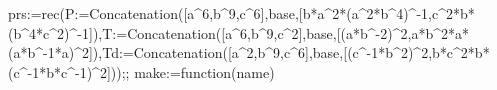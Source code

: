 \documentclass[
  10pt,
  letterpaper,
]{article}
\newenvironment{Shaded}{}{}
\newcommand{\BuiltInTok}[1]{\textcolor[rgb]{0.00,0.50,0.00}{#1}}
\newcommand{\ExtensionTok}[1]{#1}
\newcommand{\FloatTok}[1]{\textcolor[rgb]{0.25,0.63,0.44}{#1}}
\newcommand{\FunctionTok}[1]{\textcolor[rgb]{0.02,0.16,0.49}{#1}}
\newcommand{\NormalTok}[1]{#1}
\newcommand{\OperatorTok}[1]{\textcolor[rgb]{0.40,0.40,0.40}{#1}}
\newcommand{\VariableTok}[1]{\textcolor[rgb]{0.10,0.09,0.49}{#1}}
\begin{document}
\begin{Shaded}
\begin{Highlighting}[]
\VariableTok{prs}\OperatorTok{:=}\ExtensionTok{rec}\NormalTok{(}\VariableTok{P}\OperatorTok{:=}\BuiltInTok{Concatenation}\NormalTok{([}\VariableTok{a}\OperatorTok{\^{}}\FloatTok{6}\OperatorTok{,}\VariableTok{b}\OperatorTok{\^{}}\FloatTok{9}\OperatorTok{,}\VariableTok{c}\OperatorTok{\^{}}\FloatTok{6}\NormalTok{]}\OperatorTok{,}\VariableTok{base}\OperatorTok{,}\NormalTok{[}\VariableTok{b}\OperatorTok{*}\VariableTok{a}\OperatorTok{\^{}}\FloatTok{2}\OperatorTok{*}\NormalTok{(}\VariableTok{a}\OperatorTok{\^{}}\FloatTok{2}\OperatorTok{*}\VariableTok{b}\OperatorTok{\^{}}\FloatTok{4}\NormalTok{)}\OperatorTok{\^{}{-}}\FloatTok{1}\OperatorTok{,}\VariableTok{c}\OperatorTok{\^{}}\FloatTok{2}\OperatorTok{*}\VariableTok{b}\OperatorTok{*}\NormalTok{(}\VariableTok{b}\OperatorTok{\^{}}\FloatTok{4}\OperatorTok{*}\VariableTok{c}\OperatorTok{\^{}}\FloatTok{2}\NormalTok{)}\OperatorTok{\^{}{-}}\FloatTok{1}\NormalTok{])}\OperatorTok{,}\VariableTok{T}\OperatorTok{:=}\BuiltInTok{Concatenation}\NormalTok{([}\VariableTok{a}\OperatorTok{\^{}}\FloatTok{6}\OperatorTok{,}\VariableTok{b}\OperatorTok{\^{}}\FloatTok{9}\OperatorTok{,}\VariableTok{c}\OperatorTok{\^{}}\FloatTok{2}\NormalTok{]}\OperatorTok{,}\VariableTok{base}\OperatorTok{,}\NormalTok{[(}\VariableTok{a}\OperatorTok{*}\VariableTok{b}\OperatorTok{\^{}{-}}\FloatTok{2}\NormalTok{)}\OperatorTok{\^{}}\FloatTok{2}\OperatorTok{,}\VariableTok{a}\OperatorTok{*}\VariableTok{b}\OperatorTok{\^{}}\FloatTok{2}\OperatorTok{*}\VariableTok{a}\OperatorTok{*}\NormalTok{(}\VariableTok{a}\OperatorTok{*}\VariableTok{b}\OperatorTok{\^{}{-}}\FloatTok{1}\OperatorTok{*}\VariableTok{a}\NormalTok{)}\OperatorTok{\^{}}\FloatTok{2}\NormalTok{])}\OperatorTok{,}\VariableTok{Td}\OperatorTok{:=}\BuiltInTok{Concatenation}\NormalTok{([}\VariableTok{a}\OperatorTok{\^{}}\FloatTok{2}\OperatorTok{,}\VariableTok{b}\OperatorTok{\^{}}\FloatTok{9}\OperatorTok{,}\VariableTok{c}\OperatorTok{\^{}}\FloatTok{6}\NormalTok{]}\OperatorTok{,}\VariableTok{base}\OperatorTok{,}\NormalTok{[(}\VariableTok{c}\OperatorTok{\^{}{-}}\FloatTok{1}\OperatorTok{*}\VariableTok{b}\OperatorTok{\^{}}\FloatTok{2}\NormalTok{)}\OperatorTok{\^{}}\FloatTok{2}\OperatorTok{,}\VariableTok{b}\OperatorTok{*}\VariableTok{c}\OperatorTok{\^{}}\FloatTok{2}\OperatorTok{*}\VariableTok{b}\OperatorTok{*}\NormalTok{(}\VariableTok{c}\OperatorTok{\^{}{-}}\FloatTok{1}\OperatorTok{*}\VariableTok{b}\OperatorTok{*}\VariableTok{c}\OperatorTok{\^{}{-}}\FloatTok{1}\NormalTok{)}\OperatorTok{\^{}}\FloatTok{2}\NormalTok{]))}\OperatorTok{;;}
\VariableTok{make}\OperatorTok{:=}\FunctionTok{function}\NormalTok{(}\VariableTok{name}\NormalTok{)}

\end{Highlighting}
\end{Shaded}
\end{document}
